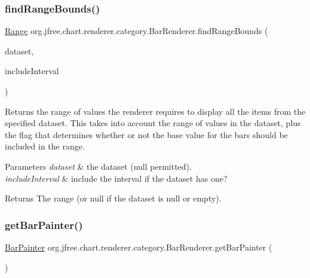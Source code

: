 \subsubsection{\texorpdfstring{find\+Range\+Bounds()}{findRangeBounds()}}
{\footnotesize\ttfamily \mbox{\hyperlink{classorg_1_1jfree_1_1data_1_1_range}{Range}} org.\+jfree.\+chart.\+renderer.\+category.\+Bar\+Renderer.\+find\+Range\+Bounds (\begin{DoxyParamCaption}\item[{\mbox{\hyperlink{interfaceorg_1_1jfree_1_1data_1_1category_1_1_category_dataset}{Category\+Dataset}}}]{dataset,  }\item[{boolean}]{include\+Interval }\end{DoxyParamCaption})}

Returns the range of values the renderer requires to display all the items from the specified dataset. This takes into account the range of values in the dataset, plus the flag that determines whether or not the base value for the bars should be included in the range.


\begin{DoxyParams}{Parameters}
{\em dataset} & the dataset ({\ttfamily null} permitted). \\
\hline
{\em include\+Interval} & include the interval if the dataset has one?\\
\hline
\end{DoxyParams}
\begin{DoxyReturn}{Returns}
The range (or {\ttfamily null} if the dataset is {\ttfamily null} or empty). 
\end{DoxyReturn}
\mbox{\label{classorg_1_1jfree_1_1chart_1_1renderer_1_1category_1_1_bar_renderer_ae011f2b42d968c51c3928b7c3d2a9267}} 
\subsubsection{\texorpdfstring{get\+Bar\+Painter()}{getBarPainter()}}
{\footnotesize\ttfamily \mbox{\hyperlink{interfaceorg_1_1jfree_1_1chart_1_1renderer_1_1category_1_1_bar_painter}{Bar\+Painter}} org.\+jfree.\+chart.\+renderer.\+category.\+Bar\+Renderer.\+get\+Bar\+Painter (\begin{DoxyParamCaption}{ }\end{DoxyParamCaption})}

